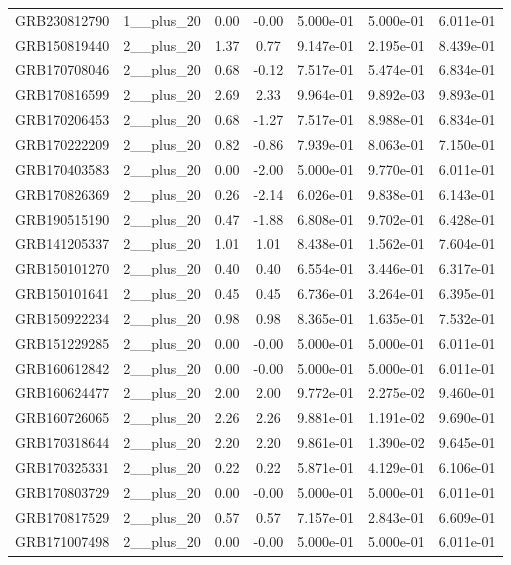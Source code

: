 \documentclass[12pt]{article}
\begin{document}
\begin{table}[h!]
{\begin{tabular}{l c c c c c c}
GRB230812790 & 1__plus_20 & 0.00 & -0.00 & 5.000e-01 & 5.000e-01 & 6.011e-01 \\
GRB150819440 & 2__plus_20 & 1.37 & 0.77 & 9.147e-01 & 2.195e-01 & 8.439e-01 \\
GRB170708046 & 2__plus_20 & 0.68 & -0.12 & 7.517e-01 & 5.474e-01 & 6.834e-01 \\
GRB170816599 & 2__plus_20 & 2.69 & 2.33 & 9.964e-01 & 9.892e-03 & 9.893e-01 \\
GRB170206453 & 2__plus_20 & 0.68 & -1.27 & 7.517e-01 & 8.988e-01 & 6.834e-01 \\
GRB170222209 & 2__plus_20 & 0.82 & -0.86 & 7.939e-01 & 8.063e-01 & 7.150e-01 \\
GRB170403583 & 2__plus_20 & 0.00 & -2.00 & 5.000e-01 & 9.770e-01 & 6.011e-01 \\
GRB170826369 & 2__plus_20 & 0.26 & -2.14 & 6.026e-01 & 9.838e-01 & 6.143e-01 \\
GRB190515190 & 2__plus_20 & 0.47 & -1.88 & 6.808e-01 & 9.702e-01 & 6.428e-01 \\
GRB141205337 & 2__plus_20 & 1.01 & 1.01 & 8.438e-01 & 1.562e-01 & 7.604e-01 \\
GRB150101270 & 2__plus_20 & 0.40 & 0.40 & 6.554e-01 & 3.446e-01 & 6.317e-01 \\
GRB150101641 & 2__plus_20 & 0.45 & 0.45 & 6.736e-01 & 3.264e-01 & 6.395e-01 \\
GRB150922234 & 2__plus_20 & 0.98 & 0.98 & 8.365e-01 & 1.635e-01 & 7.532e-01 \\
GRB151229285 & 2__plus_20 & 0.00 & -0.00 & 5.000e-01 & 5.000e-01 & 6.011e-01 \\
GRB160612842 & 2__plus_20 & 0.00 & -0.00 & 5.000e-01 & 5.000e-01 & 6.011e-01 \\
GRB160624477 & 2__plus_20 & 2.00 & 2.00 & 9.772e-01 & 2.275e-02 & 9.460e-01 \\
GRB160726065 & 2__plus_20 & 2.26 & 2.26 & 9.881e-01 & 1.191e-02 & 9.690e-01 \\
GRB170318644 & 2__plus_20 & 2.20 & 2.20 & 9.861e-01 & 1.390e-02 & 9.645e-01 \\
GRB170325331 & 2__plus_20 & 0.22 & 0.22 & 5.871e-01 & 4.129e-01 & 6.106e-01 \\
GRB170803729 & 2__plus_20 & 0.00 & -0.00 & 5.000e-01 & 5.000e-01 & 6.011e-01 \\
GRB170817529 & 2__plus_20 & 0.57 & 0.57 & 7.157e-01 & 2.843e-01 & 6.609e-01 \\
GRB171007498 & 2__plus_20 & 0.00 & -0.00 & 5.000e-01 & 5.000e-01 & 6.011e-01 \\

\end{tabular}}
\end{table}
\end{document}
